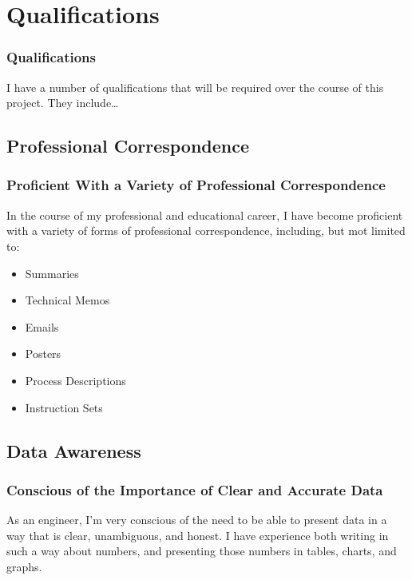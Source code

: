 \documentclass{beamer}
\begin{document}
\section{Qualifications}
\begin{frame}
  \frametitle{Qualifications}
  I have a number of qualifications that will be required over the course of
  this project. They include\ldots
\end{frame}

\subsection{Professional Correspondence}
\begin{frame}
  \frametitle{Proficient With a Variety of Professional Correspondence}
  In the course of my professional and educational career, I have become
  proficient with a variety of forms of professional correspondence,
  including, but mot limited to:
  \begin{itemize}
    \item Summaries
    \item Technical Memos
    \item Emails
    \item Posters
    \item Process Descriptions
    \item Instruction Sets
  \end{itemize}
\end{frame}

\subsection{Data Awareness}
\begin{frame}
  \frametitle{Conscious of the Importance of Clear and Accurate Data}
  As an engineer, I'm very conscious of the need to be able to present data in
  a way that is clear, unambiguous, and honest.  I have experience both
  writing in such a way about numbers, and presenting those numbers in tables,
  charts, and graphs.
\end{frame}
\end{document}
